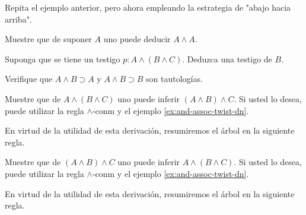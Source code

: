 \documentclass{article}
\begin{document}
\begin{exercise}
    Repita el ejemplo anterior, pero ahora empleando la estrategia de "abajo hacia arriba".
\end{exercise}
    
\begin{exercise}
    Muestre que de suponer $A$ uno puede deducir $A \land A$.
\end{exercise}

\begin{exercise}
    Suponga que se tiene un testigo $p : A \wedge (B \wedge C)$. Deduzca una testigo de
    $B$.
\end{exercise}

\begin{exercise}
    Verifique que $A \wedge B \supset A$ y $A \wedge B \supset B$ son tautologías.
\end{exercise}

\begin{exercise}
    \label{exercise: and-assoc-izq}
    Muestre que de $A \land (B \land C)$ uno puede inferir $(A \land B) \land C$.
    Si usted lo desea, puede utilizar la regla $\land$-conm y el ejemplo \ref{ex:and-assoc-twist-dn}.

    En virtud de la utilidad de esta derivación, resumiremos el árbol en la siguiente regla.

    \begin{definition}
        \label{def:and-assoc-izq-dn}
        \hfill
        \begin{prooftree}
        \end{prooftree}
    \end{definition}
\end{exercise}

\begin{exercise}
    \label{exercise: and-assoc-der}
    Muestre que de $(A \land B) \land C$ uno puede inferir $A \land (B \land C)$.
    Si usted lo desea, puede utilizar la regla $\land$-conm y el ejemplo \ref{ex:and-assoc-twist-dn}.

    En virtud de la utilidad de esta derivación, resumiremos el árbol en la siguiente regla.

    \begin{definition}
        \label{def:and-assoc-der-dn}
        \hfill
        \begin{prooftree}
        \end{prooftree}
    \end{definition}
\end{exercise}
\end{document}
